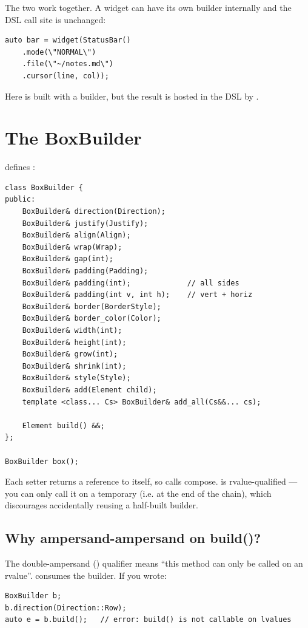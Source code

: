 The two work together. A widget can have its own builder
internally and the DSL call site is unchanged:

\begin{lstlisting}
auto bar = widget(StatusBar()
    .mode(\"NORMAL\")
    .file(\"~/notes.md\")
    .cursor(line, col));
\end{lstlisting}

Here  is built with a builder, but the result is
hosted in the DSL by .

\section{The BoxBuilder}

 defines
:

\begin{lstlisting}
class BoxBuilder {
public:
    BoxBuilder& direction(Direction);
    BoxBuilder& justify(Justify);
    BoxBuilder& align(Align);
    BoxBuilder& wrap(Wrap);
    BoxBuilder& gap(int);
    BoxBuilder& padding(Padding);
    BoxBuilder& padding(int);             // all sides
    BoxBuilder& padding(int v, int h);    // vert + horiz
    BoxBuilder& border(BorderStyle);
    BoxBuilder& border_color(Color);
    BoxBuilder& width(int);
    BoxBuilder& height(int);
    BoxBuilder& grow(int);
    BoxBuilder& shrink(int);
    BoxBuilder& style(Style);
    BoxBuilder& add(Element child);
    template <class... Cs> BoxBuilder& add_all(Cs&&... cs);

    Element build() &&;
};

BoxBuilder box();
\end{lstlisting}

Each setter returns a reference to itself, so calls compose.
 is rvalue-qualified --- you can only call it on a
temporary (i.e. at the end of the chain), which discourages
accidentally reusing a half-built builder.

\subsection*{Why ampersand-ampersand on build()?}

The double-ampersand (\code{\&\&}) qualifier means ``this method
can only be called on an rvalue''.  consumes the
builder. If you wrote:

\begin{lstlisting}
BoxBuilder b;
b.direction(Direction::Row);
auto e = b.build();   // error: build() is not callable on lvalues
\end{lstlisting}

